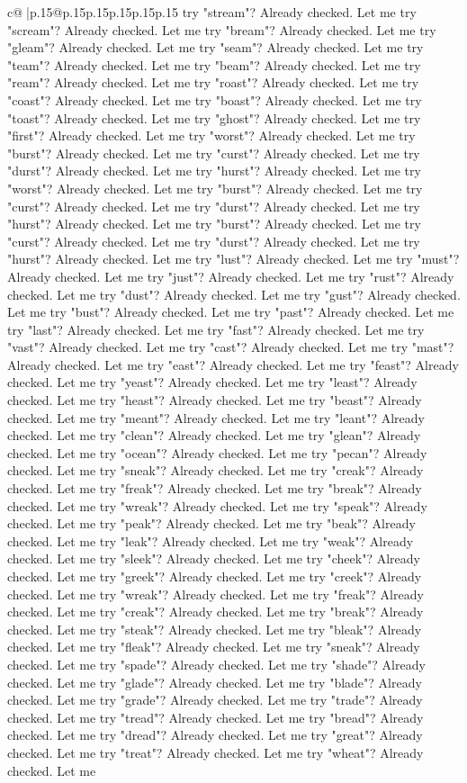 \documentclass{article}
\begin{document}
{\begin{supertabular}{c@{$\;$}|p{.15\linewidth}@{}p{.15\linewidth}p{.15\linewidth}p{.15\linewidth}p{.15\linewidth}p{.15\linewidth}}
{{{try "stream"? Already checked. Let me try "scream"? Already checked. Let me try "bream"? Already checked. Let me try "gleam"? Already checked. Let me try "seam"? Already checked. Let me try "team"? Already checked. Let me try "beam"? Already checked. Let me try "ream"? Already checked. Let me try "roast"? Already checked. Let me try "coast"? Already checked. Let me try "boast"? Already checked. Let me try "toast"? Already checked. Let me try "ghost"? Already checked. Let me try "first"? Already checked. Let me try "worst"? Already checked. Let me try "burst"? Already checked. Let me try "curst"? Already checked. Let me try "durst"? Already checked. Let me try "hurst"? Already checked. Let me try "worst"? Already checked. Let me try "burst"? Already checked. Let me try "curst"? Already checked. Let me try "durst"? Already checked. Let me try "hurst"? Already checked. Let me try "burst"? Already checked. Let me try "curst"? Already checked. Let me try "durst"? Already checked. Let me try "hurst"? Already checked. Let me try "lust"? Already checked. Let me try "must"? Already checked. Let me try "just"? Already checked. Let me try "rust"? Already checked. Let me try "dust"? Already checked. Let me try "gust"? Already checked. Let me try "bust"? Already checked. Let me try "past"? Already checked. Let me try "last"? Already checked. Let me try "fast"? Already checked. Let me try "vast"? Already checked. Let me try "cast"? Already checked. Let me try "mast"? Already checked. Let me try "east"? Already checked. Let me try "feast"? Already checked. Let me try "yeast"? Already checked. Let me try "least"? Already checked. Let me try "heast"? Already checked. Let me try "beast"? Already checked. Let me try "meant"? Already checked. Let me try "leant"? Already checked. Let me try "clean"? Already checked. Let me try "glean"? Already checked. Let me try "ocean"? Already checked. Let me try "pecan"? Already checked. Let me try "sneak"? Already checked. Let me try "creak"? Already checked. Let me try "freak"? Already checked. Let me try "break"? Already checked. Let me try "wreak"? Already checked. Let me try "speak"? Already checked. Let me try "peak"? Already checked. Let me try "beak"? Already checked. Let me try "leak"? Already checked. Let me try "weak"? Already checked. Let me try "sleek"? Already checked. Let me try "cheek"? Already checked. Let me try "greek"? Already checked. Let me try "creek"? Already checked. Let me try "wreak"? Already checked. Let me try "freak"? Already checked. Let me try "creak"? Already checked. Let me try "break"? Already checked. Let me try "steak"? Already checked. Let me try "bleak"? Already checked. Let me try "fleak"? Already checked. Let me try "sneak"? Already checked. Let me try "spade"? Already checked. Let me try "shade"? Already checked. Let me try "glade"? Already checked. Let me try "blade"? Already checked. Let me try "grade"? Already checked. Let me try "trade"? Already checked. Let me try "tread"? Already checked. Let me try "bread"? Already checked. Let me try "dread"? Already checked. Let me try "great"? Already checked. Let me try "treat"? Already checked. Let me try "wheat"? Already checked. Let me }}}
\end{supertabular}}
\end{document}
